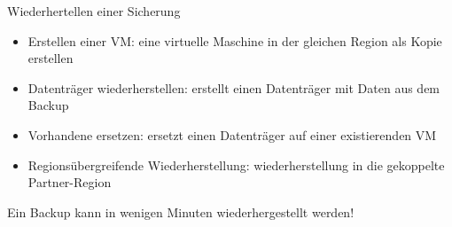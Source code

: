 \begin{flashcard}[Definition]{Wiederhertellen einer Sicherung}
    \begin{itemize}
        \item Erstellen einer VM: eine virtuelle Maschine in der gleichen Region als Kopie erstellen
        \item Datenträger wiederherstellen: erstellt einen Datenträger mit Daten aus dem Backup
        \item Vorhandene ersetzen: ersetzt einen Datenträger auf einer existierenden VM
        \item Regionsübergreifende Wiederherstellung: wiederherstellung in die gekoppelte Partner-Region
    \end{itemize}
    Ein Backup kann in wenigen Minuten wiederhergestellt werden!
\end{flashcard}
